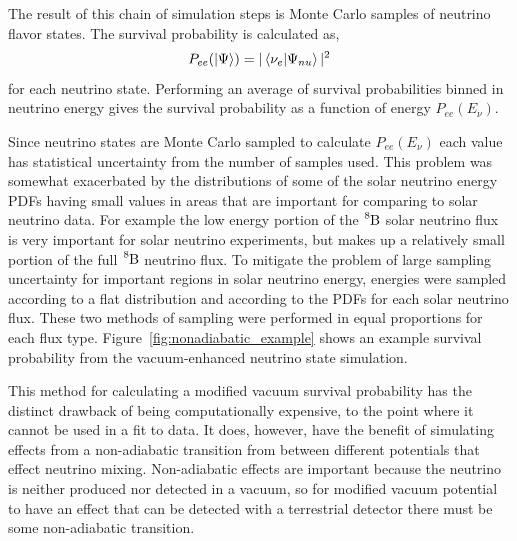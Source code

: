 The result of this chain of simulation steps is Monte Carlo samples
of neutrino flavor states. The survival probability is calculated as,
\begin{equation}
P_{ee}(\ket{\Psi}) = |\braket{\nu_{e}}{\Psi_{nu}}|^2
\end{equation}
for each neutrino state.
Performing an average of survival probabilities binned in neutrino energy 
gives the survival probability as a function of energy $P_{ee}(E_{\nu})$.

Since neutrino states are Monte Carlo sampled to calculate $P_{ee}(E_{\nu})$
each value has statistical uncertainty from the number of samples used.
This problem was somewhat exacerbated by the distributions of some of the
solar neutrino energy PDFs having small values in areas that are important for
comparing to solar neutrino data. For example the low energy portion of the
$\ce{^{8}B}$ solar neutrino flux is very important for solar neutrino experiments,
but makes up a relatively small portion of the full $\ce{^{8}B}$ neutrino flux.
To mitigate the problem of large sampling uncertainty for important regions in
solar neutrino energy, energies were sampled according to a flat distribution
and according to the PDFs for each solar neutrino flux. These two methods of sampling
were performed in equal proportions for each flux type.
Figure~\ref{fig:nonadiabatic_example} shows an example survival probability
from the vacuum-enhanced neutrino state simulation.

This method for calculating a modified vacuum survival probability has the
distinct drawback of being computationally expensive, to the point
where it cannot be used in a fit to data.
It does, however, have the benefit of simulating effects from a non-adiabatic
transition from between different potentials that effect neutrino mixing.
Non-adiabatic effects are important because the neutrino is neither produced nor
detected in a vacuum, so for modified vacuum potential to have an effect
that can be detected with a terrestrial detector there must be some
non-adiabatic transition.

